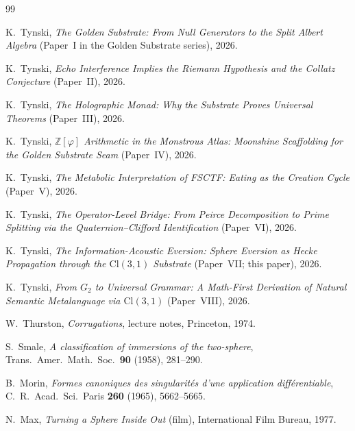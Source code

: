 \documentclass[11pt,a4paper]{article}
\theoremstyle{plain}
\theoremstyle{definition}
\theoremstyle{remark}
\numberwithin{equation}{section}
\providecommand{\Cl}{\mathrm{Cl}}
\providecommand{\ZZ}{\mathbb{Z}}
\begin{document}
\begin{thebibliography}{99}


K.~Tynski,
\emph{The Golden Substrate: From Null Generators to the Split Albert
Algebra} (Paper~I in the Golden Substrate series), 2026.

K.~Tynski,
\emph{Echo Interference Implies the Riemann Hypothesis and the Collatz
Conjecture} (Paper~II), 2026.

K.~Tynski,
\emph{The Holographic Monad: Why the Substrate Proves Universal Theorems}
(Paper~III), 2026.

K.~Tynski,
\emph{$\ZZ[\varphi]$ Arithmetic in the Monstrous Atlas: Moonshine
Scaffolding for the Golden Substrate Seam} (Paper~IV), 2026.

K.~Tynski,
\emph{The Metabolic Interpretation of FSCTF: Eating as the Creation Cycle}
(Paper~V), 2026.

K.~Tynski,
\emph{The Operator-Level Bridge: From Peirce Decomposition to Prime
Splitting via the Quaternion--Clifford Identification} (Paper~VI), 2026.

K.~Tynski,
\emph{The Information-Acoustic Eversion: Sphere Eversion as Hecke
Propagation through the $\Cl(3,1)$ Substrate} (Paper~VII;
this paper), 2026.

K.~Tynski,
\emph{From $G_2$ to Universal Grammar: A Math-First Derivation of Natural
Semantic Metalanguage via $\Cl(3,1)$} (Paper~VIII), 2026.


W.~Thurston, \emph{Corrugations}, lecture notes, Princeton, 1974.

S.~Smale, \emph{A classification of immersions of the two-sphere},
Trans.\ Amer.\ Math.\ Soc.\ \textbf{90} (1958), 281--290.

B.~Morin, \emph{Formes canoniques des singularit\'es d'une application
diff\'erentiable}, C.~R.\ Acad.\ Sci.\ Paris \textbf{260} (1965), 5662--5665.

N.~Max, \emph{Turning a Sphere Inside Out} (film), International Film
Bureau, 1977.

\end{thebibliography}
\end{document}
